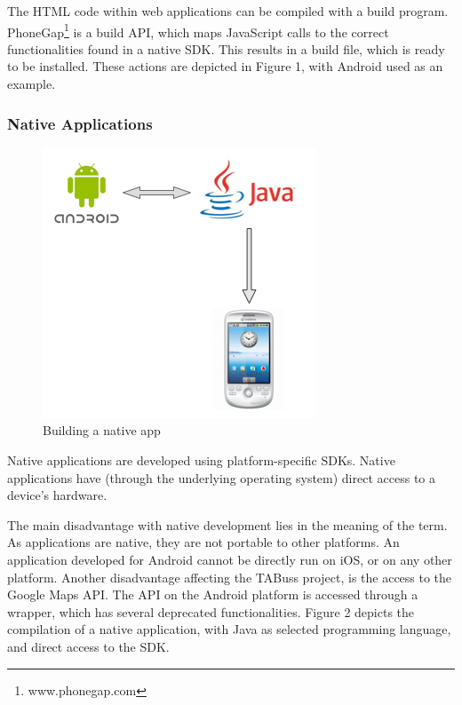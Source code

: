 The HTML code within web applications can be compiled with a build program. PhoneGap\footnote{www.phonegap.com} is a build API, which maps JavaScript calls to the correct functionalities found in a native SDK. This results in a build file, which is ready to be installed. These actions are depicted in Figure 1, with Android used as an example.

\newpage


\subsubsection{Native Applications}
\label{sec:native}
\begin{figure}
  \begin{center}
    \includegraphics[scale=0.25]{Technologies/javaandroid.png}
  \end{center}
  \caption{Building a native app}
\end{figure}
Native applications are developed using platform-specific SDKs. Native applications have (through the underlying operating system) direct access to a device's hardware.

The main disadvantage with native development lies in the meaning of the term. As applications are native, they are not portable to other platforms. An application developed for Android cannot be directly run on iOS, or on any other platform. Another disadvantage affecting the TABuss project, is the access to the Google Maps API. The API on the Android platform is accessed through a wrapper, which has several deprecated functionalities. 
Figure 2 depicts the compilation of a native application, with Java as selected programming language, and direct access to the SDK.

